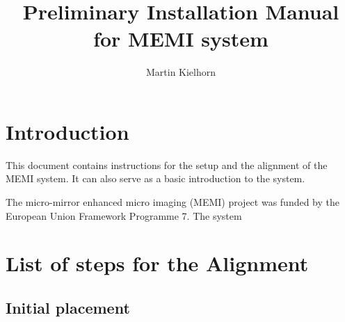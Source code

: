 \documentclass{scrartcl}
\title{Preliminary Installation Manual for MEMI system}
\author{Martin Kielhorn}
\begin{document}
\section{Introduction}
This document contains instructions for the setup and the alignment of
the MEMI system. It can also serve as a basic introduction to the
system.

The micro-mirror enhanced micro imaging (MEMI) project was funded by the
European Union Framework Programme 7. The system 

\section{List of steps for the Alignment}
\newcommand{\q}[1]{\subsection{#1}}
\q{Initial placement}
\end{document}
